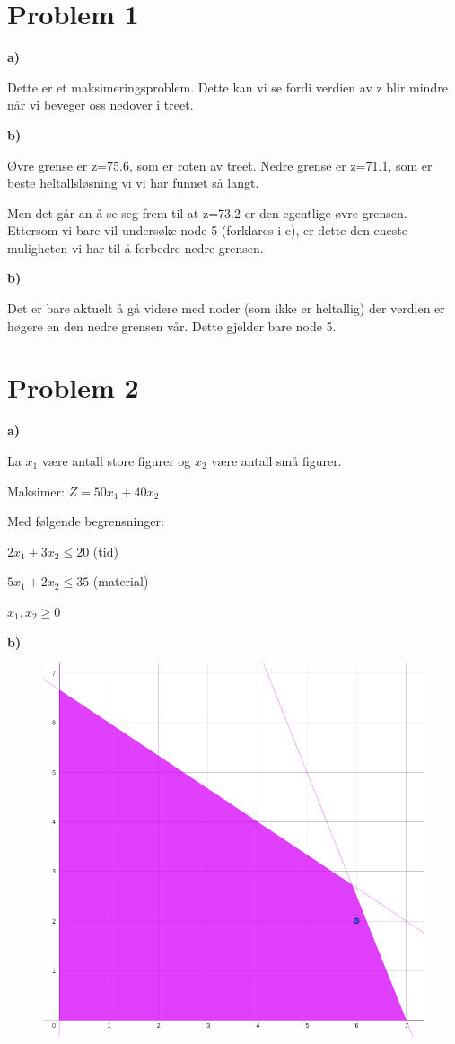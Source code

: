 \documentclass{article}
\begin{document}


\section*{\textbf{Problem 1}}
\vspace*{12pt}\small\textbf{a)}

Dette er et maksimeringsproblem. Dette kan vi se fordi verdien av z blir mindre når vi beveger oss nedover i treet. 

\vspace*{12pt}\small\textbf{b)}

Øvre grense er z=75.6, som er roten av treet.
Nedre grense er z=71.1, som er beste heltallsløsning vi vi har funnet så langt. 

Men det går an å se seg frem til at z=73.2 er den egentlige øvre grensen. Ettersom vi bare vil undersøke node 5 (forklares i c), er dette den eneste muligheten vi har til å forbedre
nedre grensen. 

\vspace*{12pt}\small\textbf{b)}

Det er bare aktuelt å gå videre med noder (som ikke er heltallig) der verdien er høgere en den nedre grensen vår. Dette gjelder bare node 5.

\section*{\textbf{Problem 2}}
\vspace*{12pt}\small\textbf{a)}

La $x_1$ være antall store figurer og $x_2$ være antall små figurer.

Maksimer: $Z = 50x_1 + 40x_2$

Med følgende begrensninger:

$2x_1 + 3x_2 \leq 20$ (tid)

$5x_1 + 2x_2 \leq 35$ (material)

$x_1, x_2 \geq 0$

\vspace*{12pt}\small\textbf{b)}

\begin{figure}[ht]
    \includegraphics*[width=0.5\linewidth]{img/image.png}
\end{figure}
\end{document}
